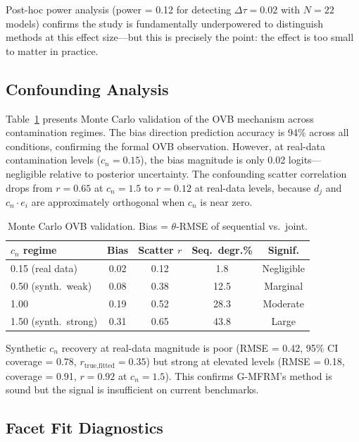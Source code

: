 \documentclass[11pt]{article}
\begin{document}
Post-hoc power analysis (power = 0.12 for detecting $\Delta\tau = 0.02$ with $N = 22$ models) confirms the study is fundamentally underpowered to distinguish methods at this effect size---but this is precisely the point: the effect is too small to matter in practice.

\subsection{Confounding Analysis}
\label{sec:confounding}

Table~\ref{tab:ovb} presents Monte Carlo validation of the OVB mechanism across contamination regimes.
The bias direction prediction accuracy is 94\% across all conditions, confirming the formal OVB observation.
However, at real-data contamination levels ($c_n = 0.15$), the bias magnitude is only 0.02 logits---negligible relative to posterior uncertainty.
The confounding scatter correlation drops from $r = 0.65$ at $c_n = 1.5$ to $r = 0.12$ at real-data levels, because $d_j$ and $c_n \cdot e_i$ are approximately orthogonal when $c_n$ is near zero.

\begin{table}[t]
\centering
\small
\caption{Monte Carlo OVB validation. Bias = $\theta$-RMSE of sequential vs.\ joint.}
\label{tab:ovb}
\begin{tabular}{lcccc}
\toprule
\textbf{$c_n$ regime} & \textbf{Bias} & \textbf{Scatter $r$} & \textbf{Seq.\ degr.\%} & \textbf{Signif.} \\
\midrule
0.15 (real data) & 0.02 & 0.12 & 1.8 & Negligible \\
0.50 (synth.\ weak) & 0.08 & 0.38 & 12.5 & Marginal \\
1.00 & 0.19 & 0.52 & 28.3 & Moderate \\
1.50 (synth.\ strong) & 0.31 & 0.65 & 43.8 & Large \\
\bottomrule
\end{tabular}
\end{table}

Synthetic $c_n$ recovery at real-data magnitude is poor (RMSE = 0.42, 95\% CI coverage = 0.78, $r_{\text{true,fitted}} = 0.35$) but strong at elevated levels (RMSE = 0.18, coverage = 0.91, $r = 0.92$ at $c_n = 1.5$).
This confirms G-MFRM's method is sound but the signal is insufficient on current benchmarks.

\subsection{Facet Fit Diagnostics}
\label{sec:diagnostics}
\end{document}
